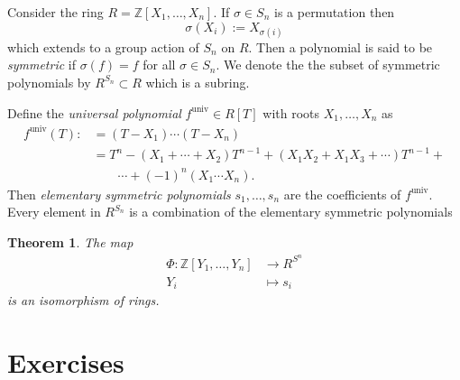 \documentclass{article}
\newcommand{\Z}{\mathbb{Z}}
\newtheorem{theorem}{Theorem}[section]
\theoremstyle{remark}
\begin{document}
    Consider the ring $R = \Z[X_1,\dots,X_n]$. If $\sigma\in S_n$ is a permutation then
    $$
        \sigma(X_i):= X_{\sigma(i)}
    $$
    which extends to a group action of $S_n$ on $R$. Then a polynomial is said to be \textit{symmetric} if $\sigma(f)=f$ for all $\sigma\in S_n$. We denote the the subset of symmetric polynomials by $R^{S_n}\subset R$ which is a subring.
    
    Define the \textit{universal polynomial} $f^{\text{univ}}\in R[T]$ with roots $X_1,\dots, X_n$ as
    \begin{align*}
        f^{\text{univ}}(T):&=(T-X_1)\cdots(T-X_n)\\&=T^n-(X_1+\cdots+X_2)T^{n-1}+(X_1X_2+X_1X_3+\cdots)T^{n-1}+\\&\qquad\cdots+(-1)^n(X_1\cdots X_n).
    \end{align*}
    Then \textit{elementary symmetric polynomials} $s_1,\dots,s_n$ are the coefficients of $f^{\text{univ}}$. Every element in $R^{S_n}$ is a combination of the elementary symmetric polynomials
    \begin{theorem}
        The map
        \begin{align*}
            \Phi:\Z[Y_1,\dots,Y_n]&\to R^{S^n}\\
            Y_i&\mapsto s_i
        \end{align*}
        is an isomorphism of rings.
    \end{theorem}

    \newpage
    \section{Exercises}
    
\end{document}
